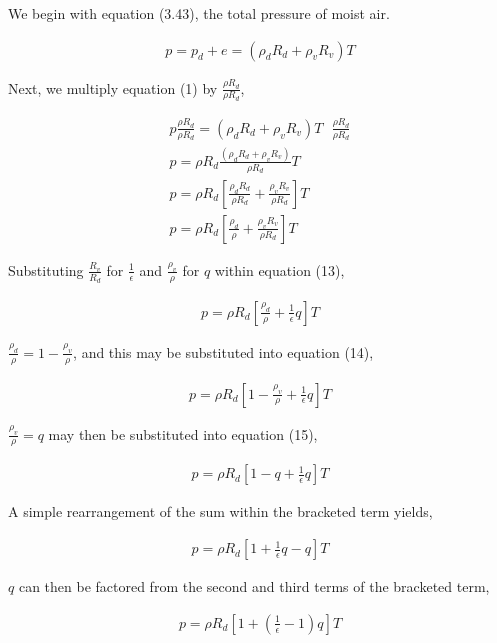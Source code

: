 \documentclass[a4paper,12pt]{article}
\begin{document}
We begin with equation (3.43), the total pressure of moist air.

\begin{align}
p = p_{d} + e = (\rho_{d}R_{d} + \rho_{v}R_{v})T
\end{align}

Next, we multiply equation (1) by $\frac{\rho R_{d}}{\rho R_{d}}$,

\begin{align}
p\frac{\rho R_{d}}{\rho R_{d}} =  (\rho_{d} R_{d} + \rho_{v} R_{v})T \text{  } \frac{\rho R_{d}}{\rho R_{d}}\\
p = \rho R_{d}\frac{ (\rho_{d}R_{d} + \rho_{v}R_{v})}{\rho R_{d}}T\\
p = \rho R_{d}\left[\frac{\rho_{d} R_{d}}{\rho R_{d}} + \frac{\rho_{v} R_{v}}{\rho R_{d}}\right]T\\
p = \rho R_{d}\left[\frac{\rho_{d}}{\rho} + \frac{\rho_{v} R_{v}}{\rho R_{d}}\right]T
\end{align}

Substituting $\frac{R_{v}}{R_{d}}$ for $\frac{1}{\epsilon}$ and $\frac{\rho_{v}}{\rho}$ for $q$ within equation (13),

\begin{align}
p = \rho R_{d}\left[\frac{\rho_{d}}{\rho} + \frac{1}{\epsilon}q\right]T
\end{align}

$\frac{\rho_{d}}{\rho} = 1 - \frac{\rho_{v}}{\rho}$, and this may be substituted into equation (14),

\begin{align}
p = \rho R_{d}\left[1 - \frac{\rho_{v}}{\rho} + \frac{1}{\epsilon}q\right]T
\end{align}

$\frac{\rho_{v}}{\rho} = q$ may then be substituted into equation (15),

\begin{align}
p = \rho R_{d}\left[1 - q + \frac{1}{\epsilon}q\right]T
\end{align}

A simple rearrangement of the sum within the bracketed term yields,

\begin{align}
p = \rho R_{d}\left[1 + \frac{1}{\epsilon}q - q\right]T
\end{align}

$q$ can then be factored from the second and third terms of the bracketed term,

\begin{align}
p = \rho R_d\left[1 + (\frac{1}{\epsilon} - 1)q\right]T
\end{align}
\end{document}
